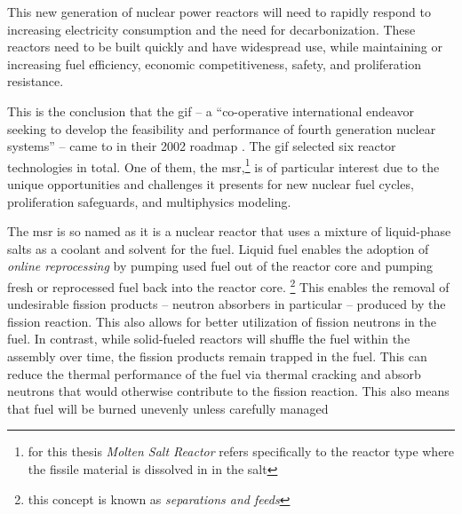 %
This new generation of nuclear power reactors will need to rapidly respond to increasing
electricity consumption and the need for decarbonization. These reactors need
to be built quickly and have widespread use, while maintaining or increasing
fuel efficiency, economic competitiveness, safety, and proliferation resistance.

This is the conclusion that the \Gls{gif} -- a ``co-operative
international endeavor seeking to develop the feasibility and performance of
fourth generation nuclear systems'' \cite{gif_homepage} -- came to in their 2002
roadmap \cite{doe-ne_technology_2002}. The \Gls{gif} selected six reactor
technologies in total. One of them, the \Gls{msr},\footnote{for
this thesis {\it Molten Salt Reactor} refers specifically to the reactor type
where the fissile material is dissolved in in the salt} is of
particular interest due to the unique opportunities and challenges it presents
for new nuclear fuel cycles, proliferation safeguards, and multiphysics
modeling.

The \Gls{msr} is so named as it is a nuclear reactor that uses a mixture of
liquid-phase salts as a coolant and solvent for the fuel. Liquid fuel enables
the adoption of {\it online reprocessing} by pumping used fuel out of the
reactor core and pumping fresh or reprocessed fuel back into the reactor core.
\footnote{this concept is known as {\it separations and feeds}} This
enables the removal of undesirable fission products -- neutron absorbers in
particular -- produced by the fission reaction. This also allows for better
utilization of fission neutrons in the fuel. In contrast, while solid-fueled
reactors will shuffle the fuel within the assembly over time, the fission
products remain trapped in the fuel. This can reduce the thermal performance of
the fuel via thermal cracking and absorb neutrons that would otherwise
contribute to the fission reaction. This also means that fuel will be burned
unevenly unless carefully managed

